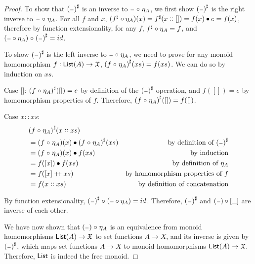 \begin{proof}
    To show that ${({\scriptstyle{-}})}^{\sharp}$ is an inverse to ${\scriptstyle{-}} \mathrel{\circ} \eta_A$,
    we first show ${({\scriptstyle{-}})}^{\sharp}$ is the right inverse to ${\scriptstyle{-}} \mathrel{\circ} \eta_A$.
    For all $f$ and $x$, $({f}^{\sharp} \circ \eta_A)(x) = {f}^{\sharp}(x :: []) = f(x) \mathbin{\bullet} e = f(x)$,
    therefore by function extensionality, for any $f$, ${f}^{\sharp} \circ \eta_A = f$,
    and $({\scriptstyle{-}} \circ \eta_A) \mathrel{\circ} {({\scriptstyle{-}})}^{\sharp} = id$.

    To show ${({\scriptstyle{-}})}^{\sharp}$ is the left inverse to ${\scriptstyle{-}} \mathrel{\circ} \eta_A$, we need to prove
    for any monoid homomorphism $f : \operatorname{\mathsf{List}}(A) \to \mathfrak{X}$, ${(f \mathrel{\circ} \eta_A)}^{\sharp}(xs) = f(xs)$.
    We can do so by induction on $xs$.

    Case []: ${(f \mathrel{\circ} \eta_A)}^{\sharp}([]) = e$ by definition of the ${({\scriptstyle{-}})}^{\sharp}$ operation,
    and $f([]) = e$ by homomorphism properties of $f$. Therefore, ${(f \mathrel{\circ} \eta_A)}^{\sharp}([]) = f([])$.

    Case $x :: xs$:
    \begin{align*}
         & {(f \mathrel{\circ} \eta_A)}^{\sharp}(x :: xs)                                                                   \\
         & = (f \mathrel{\circ} \eta_A)(x) \mathbin{\bullet} {(f \mathrel{\circ} \eta_A)}^{\sharp}(xs) & \text{by definition of ${({\scriptstyle{-}})}^{\sharp}$} \\
         & = (f \mathrel{\circ} \eta_A)(x) \mathbin{\bullet} f(xs)                      & \text{by induction}                      \\
         & = f([x]) \mathbin{\bullet} f(xs)                                   & \text{by definition of $\eta_A$}         \\
         & = f([x] \mathbin{+\kern -0.4em+} xs)                                & \text{by homomorphism properties of $f$} \\
         & = f(x :: xs)                                           & \text{by definition of concatenation}
    \end{align*}

    By function extensionality, ${({\scriptstyle{-}})}^{\sharp} \mathrel{\circ} ({\scriptstyle{-}} \circ \eta_A) = id$.
    Therefore, ${({\scriptstyle{-}})}^{\sharp}$ and $({\scriptstyle{-}}) \circ [\_]$ are inverse of each other.

    We have now shown that $({\scriptstyle{-}}) \mathrel{\circ} \eta_A$ is an equivalence from
    monoid homomorphisms $\operatorname{\mathsf{List}}(A) \to \mathfrak{X}$
    to set functions $A \to X$, and its inverse is given by ${({\scriptstyle{-}})}^{\sharp}$, which maps set
    functions $A \to X$ to monoid homomorphisms $\operatorname{\mathsf{List}}(A) \to \mathfrak{X}$. Therefore, $\operatorname{\mathsf{List}}$ is indeed
    the free monoid.
\end{proof}

